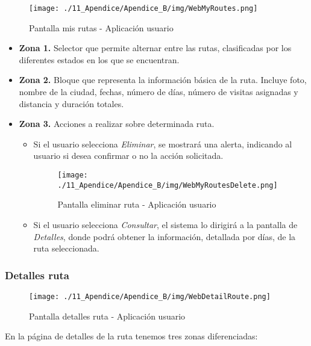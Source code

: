 \begin{figure}[H]
\centering
\texttt{[image: ./11\_Apendice/Apendice\_B/img/WebMyRoutes.png]}
\caption{Pantalla mis rutas - Aplicación usuario}
\end{figure}

\begin{itemize}
	\item \textbf{Zona 1.} Selector que permite alternar entre las rutas, clasificadas por los diferentes estados en los que se encuentran.
	\item \textbf{Zona 2.} Bloque que representa la información básica de la ruta. Incluye foto, nombre de la ciudad, fechas, número de días, número de visitas asignadas y distancia y duración totales.
	\item \textbf{Zona 3.} Acciones a realizar sobre determinada ruta.
	\begin{itemize}
		\item Si el usuario selecciona \textit{Eliminar}, se mostrará una alerta, indicando al usuario si desea confirmar o no la acción solicitada.
		\begin{figure}[H]
			\centering
			\texttt{[image: ./11\_Apendice/Apendice\_B/img/WebMyRoutesDelete.png]}
			\caption{Pantalla eliminar ruta - Aplicación usuario}
		\end{figure}


			
		\item Si el usuario selecciona \textit{Consultar}, el sistema lo dirigirá a la pantalla de \textit{Detalles}, donde podrá obtener la información, detallada por días, de la ruta seleccionada.
	\end{itemize}			
\end{itemize}


\subsubsection*{Detalles ruta}
\begin{figure}[H]
\centering
\texttt{[image: ./11\_Apendice/Apendice\_B/img/WebDetailRoute.png]}
\caption{Pantalla detalles ruta - Aplicación usuario}
\end{figure}

En la página de detalles de la ruta tenemos tres zonas diferenciadas:

